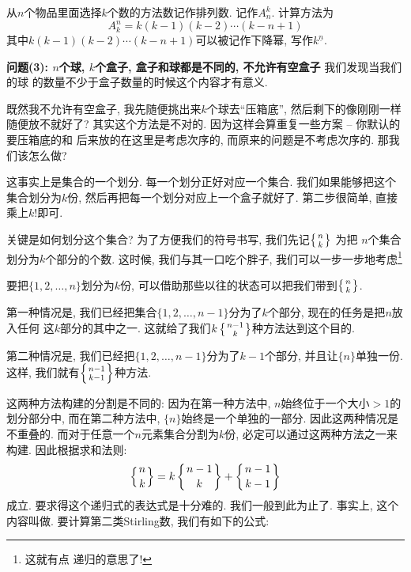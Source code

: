 \begin{definition}[排列数]
    从$n$个物品里面选择$k$个数的方法数记作排列数. 记作$A_n^k$. 计算方法为
    $$
        A_k^n = k(k-1)(k-2)\cdots(k-n+1)
    $$
    其中$k(k-1)(k-2)\cdots(k-n+1)$可以被记作下降幂, 写作$k^{\underline n}$.
\end{definition}

\textbf{问题(3): $n$个球, $k$个盒子, 盒子和球都是不同的, 不允许有空盒子} 我们发现当我们的球
的数量不少于盒子数量的时候这个内容才有意义.

既然我不允许有空盒子, 我先随便挑出来$k$个球去``压箱底'', 然后剩下的像刚刚一样
随便放不就好了? 其实这个方法是不对的. 因为这样会算重复一些方案 -- 你默认的要压箱底的和
后来放的在这里是考虑次序的, 而原来的问题是不考虑次序的. 那我们该怎么做?

这事实上是集合的一个划分. 每一个划分正好对应一个集合. 我们如果能够把这个集合划分为$k$份,
然后再把每一个划分对应上一个盒子就好了. 第二步很简单, 直接乘上$k!$即可.

关键是如何划分这个集合? 为了方便我们的符号书写, 我们先记$\left\{{n \atop k}\right\}$ 为把
$n$个集合划分为$k$个部分的个数. 这时候, 我们与其一口吃个胖子, 我们可以一步一步地考虑\footnote{这就有点
    递归的意思了!  }

要把$\{1,2,\ldots,n\}$划分为$k$份, 可以借助那些以往的状态可以把我们带到$\left\{{n \atop k}\right\}$.

第一种情况是, 我们已经把集合$\{1,2,\ldots,{n-1}\}$分为了$k$个部分, 现在的任务是把$n$放入任何
这$k$部分的其中之一. 这就给了我们$k\left\{{n-1 \atop k}\right\}$种方法达到这个目的.

第二种情况是, 我们已经把$\{1,2,\ldots,{n-1}\}$分为了$k-1$个部分, 并且让$\{n\}$单独一份.
这样, 我们就有$\left\{{n-1 \atop k-1}\right\}$种方法.

这两种方法构建的分割是不同的: 因为在第一种方法中, $n$始终位于一个大小$>1$的划分部分中,
而在第二种方法中, $\{n\}$始终是一个单独的一部分. 因此这两种情况是不重叠的.
而对于任意一个$n$元素集合分割为$k$份, 必定可以通过这两种方法之一来构建. 因此根据求和法则:
$$
    \left\{{n \atop k}\right\}=k\left\{{n-1 \atop k}\right\}+\left\{{n-1 \atop k-1}\right\}
$$
成立.
要求得这个递归式的表达式是十分难的. 我们一般到此为止了. 事实上, 这个内容叫做.
要计算第二类Stirling数, 我们有如下的公式:



